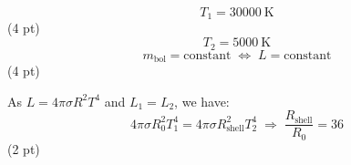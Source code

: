 \[
  T_1 = 30000\ \mathrm{K}
\]
\hfill(4 pt)
\[
  T_2 = 5000\ \mathrm{K}
\]
\[
  m_{\mathrm{bol}} = \text{constant} \;\Longleftrightarrow\; L = \text{constant}
\]
\hfill(4 pt)

As $L = 4\pi\sigma R^2 T^4$ and $L_1 = L_2$, we have:
\[
  4\pi\sigma R_0^2 T_1^4 = 4\pi\sigma R_{\mathrm{shell}}^2 T_2^4
  \;\Longrightarrow\; \frac{R_{\mathrm{shell}}}{R_0} = 36
\]
\hfill(2 pt)
